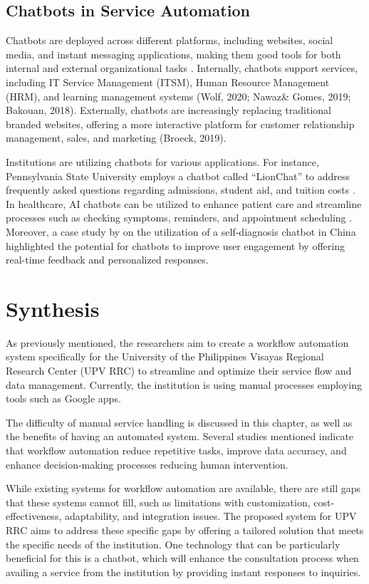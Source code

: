 \subsection{Chatbots in Service Automation}
Chatbots are deployed across different platforms, including websites, social media, and instant messaging applications, making them good tools for both internal and external organizational tasks \cite{hagberg2016, zarouali2018}. Internally, chatbots support services, including IT Service Management (ITSM), Human Resource Management (HRM), and learning management systems (Wolf, 2020; Nawaz\& Gomes, 2019; Bakouan, 2018). Externally, chatbots are increasingly replacing traditional branded websites, offering a more interactive platform for customer relationship management, sales, and marketing (Broeck, 2019).

Institutions are utilizing chatbots for various applications. For instance, Pennsylvania State University employs a chatbot called “LionChat” to address frequently asked questions regarding admissions, student aid, and tuition costs \cite{Pennstate}. In healthcare, AI chatbots can be utilized to enhance patient care and streamline processes such as checking symptoms, reminders, and appointment scheduling \cite{altamimi2023}. Moreover, a case study by \cite{fan2021} on the utilization of a self-diagnosis chatbot in China highlighted the potential for chatbots to improve user engagement by offering real-time feedback and personalized responses.


\section{Synthesis}

As previously mentioned, the researchers aim to create a workflow automation system specifically for the University of the Philippines Visayas Regional Research Center (UPV RRC) to streamline and optimize their service flow and data management. Currently, the institution is using manual processes employing tools such as Google apps.

The difficulty of manual service handling is discussed in this chapter, as well as the benefits of having an automated system. Several studies mentioned indicate that workflow automation reduce repetitive tasks, improve data accuracy, and enhance decision-making processes reducing human intervention. 

While existing systems for workflow automation are available, there are still gaps that these systems cannot fill, such as limitations with customization, cost-effectiveness, adaptability, and integration issues. The proposed system for UPV RRC aims to address these specific gaps by offering a tailored solution that meets the specific needs of the institution. One technology that can be particularly beneficial for this is a chatbot, which will enhance the consultation process when availing a service from the institution by providing instant responses to inquiries.














